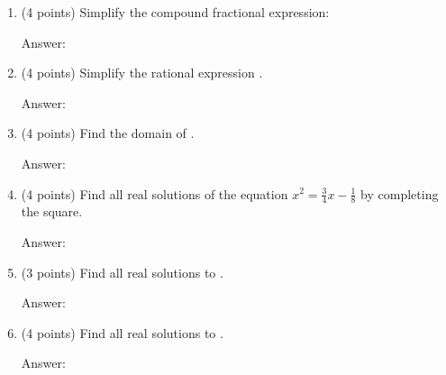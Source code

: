 \documentclass[11pt]{article}
\begin{document}
\begin{enumerate}
\item (4 points) Simplify the compound fractional expression: 
\begin{flushright}{Answer: \underline{\hspace{2in}}}\end{flushright}

\vspace{1.25in}

\item (4 points) Simplify the rational expression .\\
\begin{flushright}{Answer: \underline{\hspace{2in}}}\end{flushright}

\vspace{1in}

\item (4 points) Find the domain of .
\begin{flushright}{Answer: \underline{\hspace{2in}}}\end{flushright}

\vspace{0.75in}



\item  (4 points)  Find all real solutions of the equation $x^2=\frac{3}{4}x-\frac{1}{8}$ by completing the square.
\begin{flushright}{Answer: \underline{\hspace{2in}}}\end{flushright}

\vfill

\newpage
\item (3 points) Find all real solutions to \scalebox{1.4}{$\vert 17-2x\vert=5$}.
\begin{flushright}{Answer: \underline{\hspace{2in}}}\end{flushright}

\vfill
\item (4 points) Find all real solutions to .
\begin{flushright}{Answer: \underline{\hspace{2in}}}\end{flushright}


\end{enumerate}
\end{document}
